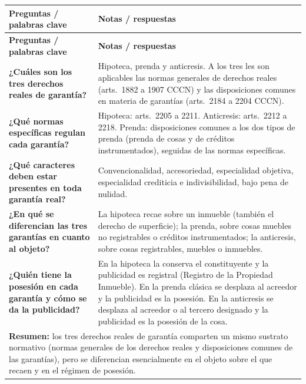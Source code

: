 \documentclass[12pt,oneside]{book}
\begin{document}
\begin{longtable}{p{}p{}}
\toprule
\textbf{Preguntas / palabras clave} & \textbf{Notas / respuestas} \\
\midrule
\endfirsthead
\toprule
\textbf{Preguntas / palabras clave} & \textbf{Notas / respuestas} \\
\midrule
\endhead

\textbf{¿Cuáles son los tres derechos reales de garantía?} &
Hipoteca, prenda y anticresis. A los tres les son aplicables las normas generales de derechos reales (arts.\ 1882 a 1907 CCCN) y las disposiciones comunes en materia de garantías (arts.\ 2184 a 2204 CCCN). \\[0.6em]

\textbf{¿Qué normas específicas regulan cada garantía?} &
Hipoteca: arts.\ 2205 a 2211. Anticresis: arts.\ 2212 a 2218. Prenda: disposiciones comunes a los dos tipos de prenda (prenda de cosas y de créditos instrumentados), seguidas de las normas específicas. \\[0.6em]

\textbf{¿Qué caracteres deben estar presentes en toda garantía real?} &
Convencionalidad, accesoriedad, especialidad objetiva, especialidad crediticia e indivisibilidad, bajo pena de nulidad. \\[0.6em]

\textbf{¿En qué se diferencian las tres garantías en cuanto al objeto?} &
La hipoteca recae sobre un inmueble (también el derecho de superficie); la prenda, sobre cosas muebles no registrables o créditos instrumentados; la anticresis, sobre cosas registrables, muebles o inmuebles. \\[0.6em]

\textbf{¿Quién tiene la posesión en cada garantía y cómo se da la publicidad?} &
En la hipoteca la conserva el constituyente y la publicidad es registral (Registro de la Propiedad Inmueble). En la prenda clásica se desplaza al acreedor y la publicidad es la posesión. En la anticresis se desplaza al acreedor o al tercero designado y la publicidad es la posesión de la cosa. \\

\midrule
\multicolumn{2}{p{\dimexpr0.93\textwidth+2\tabcolsep\relax}}{%
\textbf{Resumen:} los tres derechos reales de garantía comparten un mismo sustrato normativo (normas generales de los derechos reales y disposiciones comunes de las garantías), pero se diferencian esencialmente en el objeto sobre el que recaen y en el régimen de posesión.} \\
\bottomrule
\end{longtable}
\end{document}
